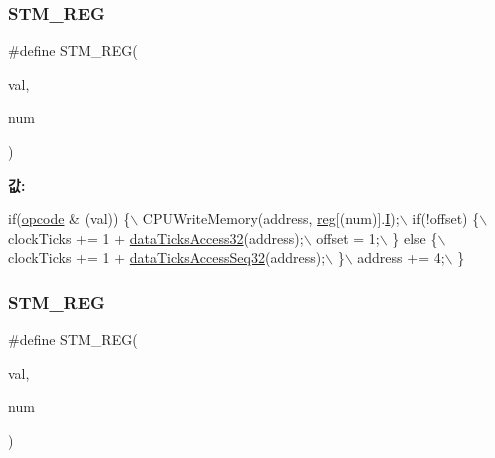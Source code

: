 \subsubsection{\texorpdfstring{S\+T\+M\+\_\+\+R\+EG}{STM\_REG}\hspace{0.1cm}{\footnotesize\ttfamily [1/2]}}
{\footnotesize\ttfamily \#define S\+T\+M\+\_\+\+R\+EG(\begin{DoxyParamCaption}\item[{}]{val,  }\item[{}]{num }\end{DoxyParamCaption})}

{\bfseries 값\+:}
\begin{DoxyCode}
\textcolor{keywordflow}{if}(\mbox{\hyperlink{arm-new_8h_a4fc220098f4b9d0e039a28274d05c198}{opcode}} & (val)) \{\(\backslash\)
    CPUWriteMemory(address, \mbox{\hyperlink{_g_b_a_8h_ae29faba89509024ffd1a292badcedf2d}{reg}}[(num)].\mbox{\hyperlink{arm-new_8h_a782b7c7c9a56a2031f6270eac7f000d6}{I}});\(\backslash\)
    if(!offset) \{\(\backslash\)
      clockTicks += 1 + \mbox{\hyperlink{_g_b_a_8cpp_ac863611762e3e5f63cd5babe38b2fcc7}{dataTicksAccess32}}(address);\(\backslash\)
      offset = 1;\(\backslash\)
    \} \textcolor{keywordflow}{else} \{\(\backslash\)
      clockTicks += 1 + \mbox{\hyperlink{_g_b_a_8cpp_a7f6f2734b76f7d8031fc2ffc5673aa74}{dataTicksAccessSeq32}}(address);\(\backslash\)
    \}\(\backslash\)
    address += 4;\(\backslash\)
  \}
\end{DoxyCode}
\mbox{\label{_g_b_a_8cpp_a4e029c81c1b7f6a28d49485aff8d74b8}} 
\subsubsection{\texorpdfstring{S\+T\+M\+\_\+\+R\+EG}{STM\_REG}\hspace{0.1cm}{\footnotesize\ttfamily [2/2]}}
{\footnotesize\ttfamily \#define S\+T\+M\+\_\+\+R\+EG(\begin{DoxyParamCaption}\item[{}]{val,  }\item[{}]{num }\end{DoxyParamCaption})}


